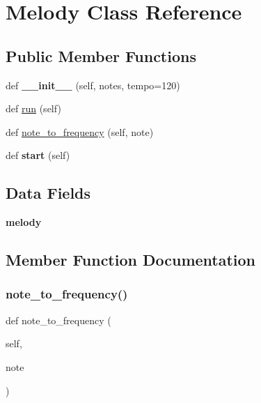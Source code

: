 \hypertarget{classsound_1_1_melody}{}\section{Melody Class Reference}
\label{classsound_1_1_melody}
\subsection*{Public Member Functions}
\begin{DoxyCompactItemize}
\item 
\mbox{\label{classsound_1_1_melody_adc4fb139d23426685b06da2effdcac91}} 
def {\bfseries \+\_\+\+\_\+init\+\_\+\+\_\+} (self, notes, tempo=120)
\item 
def \mbox{\hyperlink{classsound_1_1_melody_ad22709b2e67308af35f55680d5a026e0}{run}} (self)
\item 
def \mbox{\hyperlink{classsound_1_1_melody_ad9d863e8e1abe12c6319e655dbe176ee}{note\+\_\+to\+\_\+frequency}} (self, note)
\item 
\mbox{\label{classsound_1_1_melody_af1af6ddf04f00f958949618f79c33b82}} 
def {\bfseries start} (self)
\end{DoxyCompactItemize}
\subsection*{Data Fields}
\begin{DoxyCompactItemize}
\item 
\mbox{\label{classsound_1_1_melody_a01894a43a61c417313503684c2039eaa}} 
{\bfseries melody}
\end{DoxyCompactItemize}


\subsection{Member Function Documentation}
\mbox{\label{classsound_1_1_melody_ad9d863e8e1abe12c6319e655dbe176ee}} 
\subsubsection{\texorpdfstring{note\+\_\+to\+\_\+frequency()}{note\_to\_frequency()}}
{\footnotesize\ttfamily def note\+\_\+to\+\_\+frequency (\begin{DoxyParamCaption}\item[{}]{self,  }\item[{}]{note }\end{DoxyParamCaption})}

